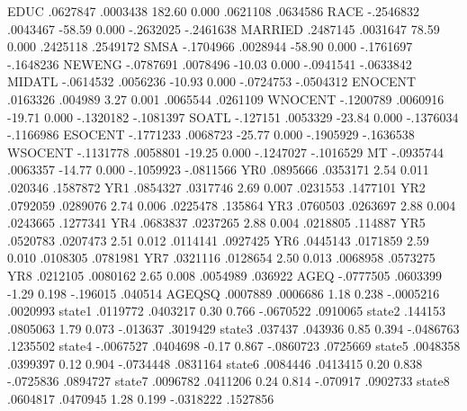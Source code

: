         EDUC {\VBAR}   .0627847   .0003438   182.60   0.000     .0621108    .0634586
        RACE {\VBAR}  -.2546832   .0043467   -58.59   0.000    -.2632025   -.2461638
     MARRIED {\VBAR}   .2487145   .0031647    78.59   0.000     .2425118    .2549172
        SMSA {\VBAR}  -.1704966   .0028944   -58.90   0.000    -.1761697   -.1648236
      NEWENG {\VBAR}  -.0787691   .0078496   -10.03   0.000    -.0941541   -.0633842
      MIDATL {\VBAR}  -.0614532   .0056236   -10.93   0.000    -.0724753   -.0504312
     ENOCENT {\VBAR}   .0163326    .004989     3.27   0.001     .0065544    .0261109
     WNOCENT {\VBAR}  -.1200789   .0060916   -19.71   0.000    -.1320182   -.1081397
       SOATL {\VBAR}   -.127151   .0053329   -23.84   0.000    -.1376034   -.1166986
     ESOCENT {\VBAR}  -.1771233   .0068723   -25.77   0.000    -.1905929   -.1636538
     WSOCENT {\VBAR}  -.1131778   .0058801   -19.25   0.000    -.1247027   -.1016529
          MT {\VBAR}  -.0935744   .0063357   -14.77   0.000    -.1059923   -.0811566
         YR0 {\VBAR}   .0895666   .0353171     2.54   0.011      .020346    .1587872
         YR1 {\VBAR}   .0854327   .0317746     2.69   0.007     .0231553    .1477101
         YR2 {\VBAR}   .0792059   .0289076     2.74   0.006     .0225478     .135864
         YR3 {\VBAR}   .0760503   .0263697     2.88   0.004     .0243665    .1277341
         YR4 {\VBAR}   .0683837   .0237265     2.88   0.004     .0218805     .114887
         YR5 {\VBAR}   .0520783   .0207473     2.51   0.012     .0114141    .0927425
         YR6 {\VBAR}   .0445143   .0171859     2.59   0.010     .0108305    .0781981
         YR7 {\VBAR}   .0321116   .0128654     2.50   0.013     .0068958    .0573275
         YR8 {\VBAR}   .0212105   .0080162     2.65   0.008     .0054989     .036922
        AGEQ {\VBAR}  -.0777505   .0603399    -1.29   0.198     -.196015     .040514
      AGEQSQ {\VBAR}   .0007889   .0006686     1.18   0.238    -.0005216    .0020993
      state1 {\VBAR}   .0119772   .0403217     0.30   0.766    -.0670522    .0910065
      state2 {\VBAR}    .144153   .0805063     1.79   0.073     -.013637    .3019429
      state3 {\VBAR}    .037437    .043936     0.85   0.394    -.0486763    .1235502
      state4 {\VBAR}  -.0067527   .0404698    -0.17   0.867    -.0860723    .0725669
      state5 {\VBAR}   .0048358   .0399397     0.12   0.904    -.0734448    .0831164
      state6 {\VBAR}   .0084446   .0413415     0.20   0.838    -.0725836    .0894727
      state7 {\VBAR}   .0096782   .0411206     0.24   0.814     -.070917    .0902733
      state8 {\VBAR}   .0604817   .0470945     1.28   0.199    -.0318222    .1527856

